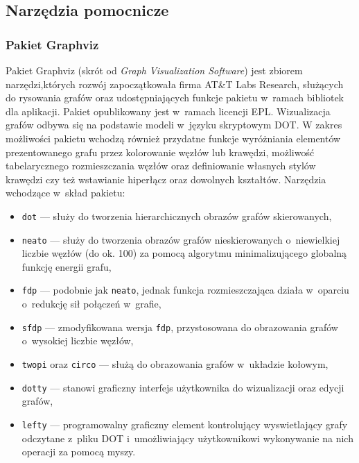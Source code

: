 \subsection{Narzędzia pomocnicze}\label{ss_internals_misc}
\subsubsection{\textbf{Pakiet Graphviz}}
\label{sss_internals_misc_graphviz}
\par{
  Pakiet Graphviz (skrót od \emph{Graph Visualization Software}) jest zbiorem narzędzi,których rozwój zapoczątkowała firma AT\&T Labs Research, służących do rysowania grafów oraz udostępniających funkcje pakietu w~ramach bibliotek dla aplikacji.
  Pakiet opublikowany jest w~ramach licencji EPL.
  Wizualizacja grafów odbywa się na podstawie modeli w~języku skryptowym DOT.
  W zakres możliwości pakietu wchodzą również przydatne funkcje wyróżniania elementów prezentowanego grafu przez kolorowanie węzłów lub krawędzi, możliwość tabelarycznego rozmieszczania węzłów oraz definiowanie własnych stylów krawędzi czy też wstawianie hiperłącz oraz dowolnych kształtów.
  Narzędzia wchodzące w~skład pakietu:
  \begin{itemize}
    \item \texttt{dot} --- służy do tworzenia hierarchicznych obrazów grafów skierowanych,
    \item \texttt{neato} --- służy do tworzenia obrazów grafów nieskierowanych o~niewielkiej liczbie węzłów (do ok. 100) za pomocą algorytmu minimalizującego globalną funkcję energii grafu,
    \item \texttt{fdp} --- podobnie jak \texttt{neato}, jednak funkcja rozmieszczająca działa w~oparciu o~redukcję sił połączeń w~grafie,
    \item \texttt{sfdp} --- zmodyfikowana wersja \texttt{fdp}, przystosowana do obrazowania grafów o~wysokiej liczbie węzłów,
    \item \texttt{twopi} oraz \texttt{circo} --- służą do obrazowania grafów w~układzie kołowym,
    \item \texttt{dotty} --- stanowi graficzny interfejs użytkownika do wizualizacji oraz edycji grafów,
    \item \texttt{lefty} --- programowalny graficzny element kontrolujący wyswietlający grafy odczytane z~pliku DOT i~umożliwiający użytkownikowi wykonywanie na nich operacji za pomocą myszy.
  \end{itemize}
}
